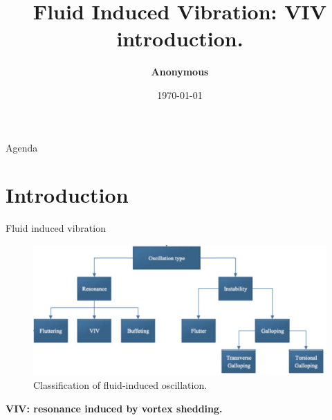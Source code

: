 \documentclass[9pt, xcolor=table]{beamer}
\title[VIV introduction] {\LARGE{\textbf{Fluid Induced Vibration: VIV introduction.}}}
\author[Anonymous]{\Large{\textbf{Anonymous}}}
\institute[Master Student] {School of Mechanical Engineering and Automation
}
\date{\today}
\begin{document}
%
\begin{frame}[plain]
	\titlepage
\end{frame}
%
\begin{frame}{Agenda}
	\tableofcontents
\end{frame}
%
%
\section{Introduction}
\begin{frame}{Fluid induced vibration}
	\begin{figure}
		\centering\includegraphics[height=5cm]{未标题-1.jpg}
		\caption{Classification of fluid-induced oscillation.}
	\end{figure}

	\centering
	\textbf{VIV: resonance induced by vortex shedding.}
\end{frame}
%
\end{document}
